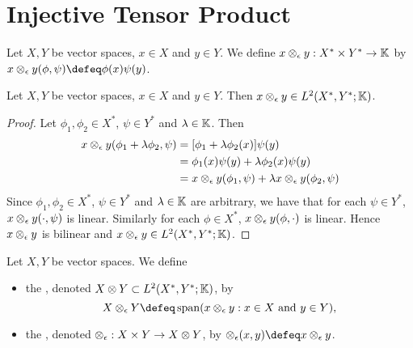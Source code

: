 \documentclass{book}
\begin{document}


\section{Injective Tensor Product}

\begin{defn}
	Let $X, Y$ be vector spaces, $x \in X$ and $y \in Y$. We define $x \otimes_{\epsilon} y: X^* \times Y^* \rightarrow  \mathbb{K}$ by $x \otimes_{\ep} y(\phi, \psi) \defeq \phi(x) \psi(y)$.  
\end{defn}


\begin{ex}
	Let $X, Y$ be vector spaces, $x \in X$ and $y \in Y$. Then $x \otimes_{\epsilon} y \in L^2(X^*, Y^*; \mathbb{K})$. 
\end{ex}

\begin{proof}
	Let $\phi_1, \phi_2 \in X^*$, $\psi \in Y^*$ and $\lambda \in \mathbb{K}$. Then 
	\begin{align*}
		x \otimes_{\epsilon} y(\phi_1 + \lambda \phi_2, \psi) 
		& = [\phi_1 + \lambda \phi_2 (x)] \psi(y) \\
		& = \phi_1(x)\psi(y) + \lambda \phi_2(x)\psi(y) \\
		& = x \otimes_{\epsilon} y(\phi_1, \psi) + \lambda x \otimes_{\epsilon} y(\phi_2, \psi)
	\end{align*}
	Since $\phi_1, \phi_2 \in X^*$, $\psi \in Y^*$ and $\lambda \in \mathbb{K}$ are arbitrary, we have that for each $\psi \in Y^*$, $x \otimes_{\epsilon} y(\cdot, \psi)$ is linear. Similarly for each $\phi \in X^*$, $x \otimes_{\epsilon} y(\phi, \cdot)$ is linear. Hence $x \otimes_{\epsilon} y$ is bilinear and $x \otimes_{\epsilon} y \in L^2(X^*, Y^*; \mathbb{K})$. 
\end{proof}

\begin{defn}
	Let $X, Y$ be vector spaces. We define  
	\begin{itemize}
		\item the , denoted $X \otimes Y \subset L^2(X^*, Y^*; \mathbb{K})$, by 
		$$X \otimes_{\ep} Y \defeq \spn(\text{$x \otimes_{\ep} y: x \in X$ and $y \in Y$}),$$
		\item the , denoted $\otimes_{\epsilon}: X \times Y \rightarrow X \otimes Y$, by $\otimes_{\ep}(x, y) \defeq x \otimes_{\ep} y$.
	\end{itemize}
\end{defn}
\end{document}
